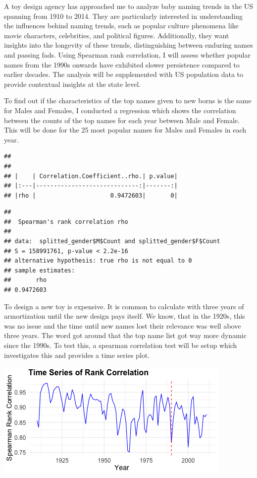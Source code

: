 \documentclass[11pt,preprint, authoryear]{elsarticle}
\let\origfigure\figure
\let\endorigfigure\endfigure
\renewenvironment{figure}[1][2] {
    \expandafter\origfigure\expandafter[H]
} {
    \endorigfigure
}
\numberwithin{equation}{section}
\numberwithin{figure}{section}
\numberwithin{table}{section}
\begin{document}
A toy design agency has approached me to analyze baby naming trends in
the US spanning from 1910 to 2014. They are particularly interested in
understanding the influences behind naming trends, such as popular
culture phenomena like movie characters, celebrities, and political
figures. Additionally, they want insights into the longevity of these
trends, distinguishing between enduring names and passing fads. Using
Spearman rank correlation, I will assess whether popular names from the
1990s onwards have exhibited slower persistence compared to earlier
decades. The analysis will be supplemented with US population data to
provide contextual insights at the state level.

To find out if the characteristics of the top names given to new borns
is the same for Males and Females, I conducted a regression which shows
the correlation between the counts of the top names for each year
between Male and Female. This will be done for the 25 most popular names
for Males and Females in each year.

\begin{verbatim}
## 
## 
## |    | Correlation.Coefficient..rho.| p.value|
## |:---|-----------------------------:|-------:|
## |rho |                     0.9472603|       0|
\end{verbatim}

\begin{verbatim}
## 
##  Spearman's rank correlation rho
## 
## data:  splitted_gender$M$Count and splitted_gender$F$Count
## S = 158991761, p-value < 2.2e-16
## alternative hypothesis: true rho is not equal to 0
## sample estimates:
##       rho 
## 0.9472603
\end{verbatim}

To design a new toy is expensive. It is common to calculate with three
years of armortization until the new design pays itself. We know, that
in the 1920s, this was no issue and the time until new names lost their
relevance was well above three years. The word got around that the top
name list got way more dynamic since the 1990s. To test this, a spearman
correlation test will be setup which investigates this and provides a
time series plot.

\begin{figure}[H]

{\centering \includegraphics{Question1_files/figure-latex/Figure2-1} 

}

\caption{Caption Here \label{Figure2}}\label{fig:Figure2}
\end{figure}
\end{document}
